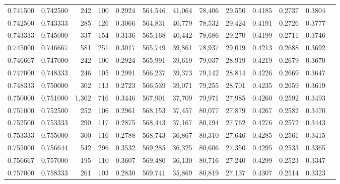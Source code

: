 \begin{tabular}{rrrrrrrrrrrrr}
0.741500 & 0.742500 &   242 & 100 &                                     0.2924 & 564,546 &  41,064 &  78,406 &  29,550 & 0.4185 & 0.2737 & 0.3804 \\
0.742500 & 0.743333 &   285 & 126 &                                     0.3066 & 564,831 &  40,779 &  78,532 &  29,424 & 0.4191 & 0.2726 & 0.3777 \\
0.743333 & 0.745000 &   337 & 154 &                                     0.3136 & 565,168 &  40,442 &  78,686 &  29,270 & 0.4199 & 0.2711 & 0.3746 \\
0.745000 & 0.746667 &   581 & 251 &                                     0.3017 & 565,749 &  39,861 &  78,937 &  29,019 & 0.4213 & 0.2688 & 0.3692 \\
0.746667 & 0.747000 &   242 & 100 &                                     0.2924 & 565,991 &  39,619 &  79,037 &  28,919 & 0.4219 & 0.2679 & 0.3670 \\
0.747000 & 0.748333 &   246 & 105 &                                     0.2991 & 566,237 &  39,373 &  79,142 &  28,814 & 0.4226 & 0.2669 & 0.3647 \\
0.748333 & 0.750000 &   302 & 113 &                                     0.2723 & 566,539 &  39,071 &  79,255 &  28,701 & 0.4235 & 0.2659 & 0.3619 \\
0.750000 & 0.751000 & 1,362 & 716 &                                     0.3446 & 567,901 &  37,709 &  79,971 &  27,985 & 0.4260 & 0.2592 & 0.3493 \\
0.751000 & 0.752500 &   252 & 106 &                                     0.2961 & 568,153 &  37,457 &  80,077 &  27,879 & 0.4267 & 0.2582 & 0.3470 \\
0.752500 & 0.753333 &   290 & 117 &                                     0.2875 & 568,443 &  37,167 &  80,194 &  27,762 & 0.4276 & 0.2572 & 0.3443 \\
0.753333 & 0.755000 &   300 & 116 &                                     0.2788 & 568,743 &  36,867 &  80,310 &  27,646 & 0.4285 & 0.2561 & 0.3415 \\
0.755000 & 0.756644 &   542 & 296 &                                     0.3532 & 569,285 &  36,325 &  80,606 &  27,350 & 0.4295 & 0.2533 & 0.3365 \\
0.756667 & 0.757000 &   195 & 110 &                                     0.3607 & 569,480 &  36,130 &  80,716 &  27,240 & 0.4299 & 0.2523 & 0.3347 \\
0.757000 & 0.758333 &   261 & 103 &                                     0.2830 & 569,741 &  35,869 &  80,819 &  27,137 & 0.4307 & 0.2514 & 0.3323 \\

\end{tabular}
